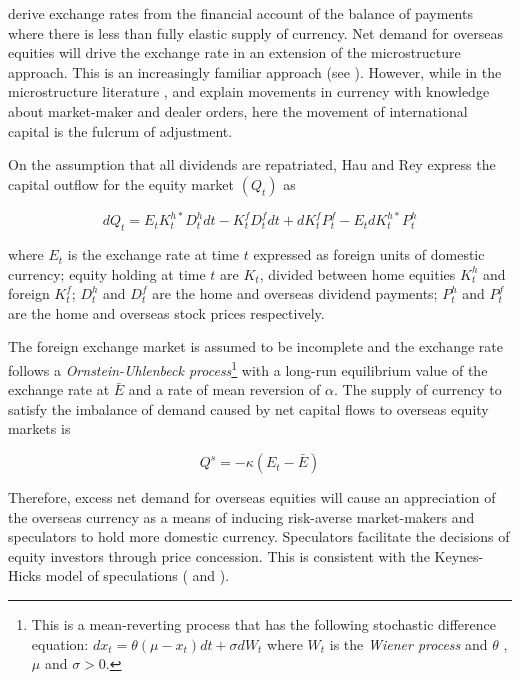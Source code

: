 \documentclass[12pt, a4paper, oneside]{article}\usepackage[]{graphicx}\usepackage[]{color}
\begin{document}
\citet{HauEquity} derive exchange rates from the financial account of the balance of payments where there is less than fully elastic supply of currency.  Net demand for overseas equities will drive the exchange rate in an extension of the microstructure approach.  This is an increasingly familiar approach (see \citet{Geliman}). However, while in the microstructure literature \citet{Evans2002Order}, \citet{Lyons1995Microstructure} and \citet{rime2010exchange} explain movements in currency with knowledge about market-maker and dealer orders, here the movement of international capital is the fulcrum of adjustment.

On the assumption that all dividends are repatriated, Hau and Rey express the capital outflow for the equity market $(Q_t)$ as

\begin{equation}
dQ_t = E_tK_t^{h*}D_t^hdt - K_t^fD_t^fdt + dK_t^fP_t^f - E_tdK_t^{h*}P_t^h
\end{equation}

where $E_t$ is the exchange rate at time $t$ expressed as foreign units of domestic currency; equity holding at time $t$ are $K_t$, divided between home equities $K_t^h$ and foreign $K_t^f$; $D^h_t$ and $D^f_t$ are the home and overseas dividend payments; $P_t^h$ and $P_t^f$ are the home and overseas stock prices respectively.   

The foreign exchange market is assumed to be incomplete and the exchange rate follows a \emph{Ornstein-Uhlenbeck process}\footnote{This is a mean-reverting process that has the following stochastic difference equation: $dx_t = \theta(\mu - x_t)dt + \sigma dW_t$ where $W_t$ is the \emph{Wiener process} and $\theta$ , $\mu$ and $\sigma > 0$.} with a long-run equilibrium value of the exchange rate at $\bar{E}$ and a rate of mean reversion of $\alpha$. The supply of currency to satisfy the imbalance of demand caused by net capital flows to overseas equity markets is 

\begin{equation}
Q^s = -\kappa(E_t - \bar{E})
\end{equation}

Therefore, excess net demand for overseas equities will cause an appreciation of the overseas currency as a means of inducing risk-averse market-makers and speculators to hold more domestic currency.  Speculators facilitate the decisions of equity investors through price concession. This is consistent with the Keynes-Hicks model of speculations ( \citet{KeynesHedge} and \citet{HicksHedge}).   
\end{document}
